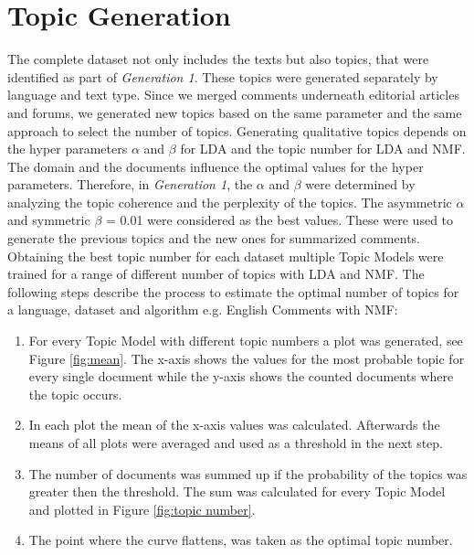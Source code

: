 \section{Topic Generation}
The complete dataset not only includes the texts but also topics, that were identified as part of \textit{Generation 1}. These topics were generated separately by language and text type. Since we merged comments underneath editorial articles and forums, we generated new topics based on the same parameter and the same approach to select the number of topics.
Generating qualitative topics depends on the hyper parameters $\alpha$ and $\beta$ for \ac{LDA} and the topic number for \ac{LDA} and \ac{NMF}. The domain and the documents influence the optimal values for the hyper parameters. Therefore, in \textit{Generation 1}, the $\alpha$ and  $\beta$ were determined by analyzing the topic coherence and the perplexity of the topics. The asymmetric $\alpha$ and symmetric $\beta$ = 0.01 were considered as the best values. These were used to generate the previous topics and the new ones for summarized comments.
Obtaining the best topic number for each dataset multiple Topic Models were trained for a range of different number of topics with \ac{LDA} and \ac{NMF}. The following steps describe the process to estimate the optimal number of topics for a language, dataset and algorithm e.g. English Comments with \ac{NMF}:
\begin{enumerate}
	\item For every Topic Model with different topic numbers a plot was generated, see Figure \ref{fig:mean}.
	The x-axis shows the values for the most probable topic for every single  document while the y-axis shows the counted documents where the topic occurs.
	\item In each plot the mean of the x-axis values was calculated. Afterwards the means of all plots were averaged and used as a threshold in the next step.
	\item The number of documents was summed up if the probability of the topics was greater then the threshold. The sum was calculated for every Topic Model and plotted in Figure \ref{fig:topic number}.
	\item The point where the curve flattens, was taken as the optimal topic number.
\end{enumerate}
	
